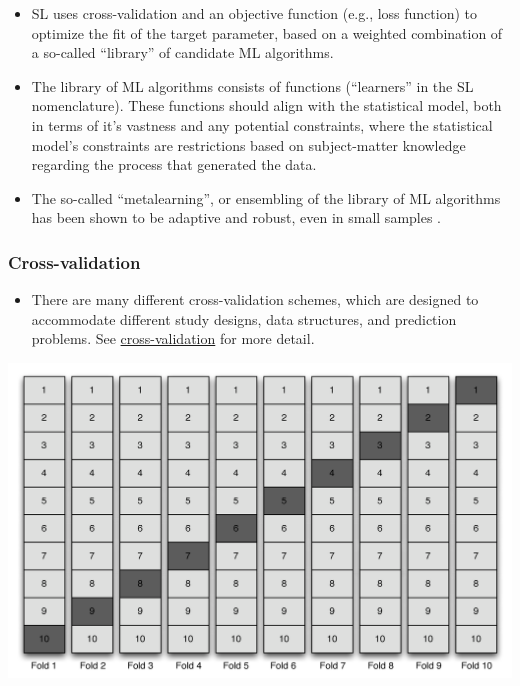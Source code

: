 \documentclass[
  12pt, krantz2,
]{book}
\providecommand{\tightlist}{%
  \setlength{\itemsep}{0pt}\setlength{\parskip}{0pt}}
\theoremstyle{definition}
\theoremstyle{definition}
\theoremstyle{definition}
\newcommand{\1}{\mathbbm{1}}
\begin{document}
\begin{itemize}
\tightlist
\item
  SL uses cross-validation and an objective function (e.g., loss function) to
  optimize the fit of the target parameter, based on a weighted combination of a
  so-called ``library'' of candidate ML algorithms.
\item
  The library of ML algorithms consists of functions (``learners'' in the SL
  nomenclature). These functions should align with the statistical model, both
  in terms of it's vastness and any potential constraints, where the
  statistical model's constraints are restrictions based on subject-matter
  knowledge regarding the process that generated the data.
\item
  The so-called ``metalearning'', or ensembling of the library of ML algorithms
  has been shown to be adaptive and robust, even in small
  samples \citep{polley2010super}.
\end{itemize}

\hypertarget{cross-validation}{%
\subsubsection{Cross-validation}\label{cross-validation}}

\begin{itemize}
\tightlist
\item
  There are many different cross-validation schemes, which are designed to
  accommodate different study designs, data structures, and prediction
  problems. See \protect\hyperlink{origami}{cross-validation} for more detail.
\end{itemize}

\begin{center}\includegraphics[width=0.8\linewidth]{img/png/vs} \end{center}
\end{document}
